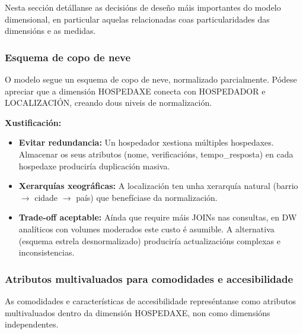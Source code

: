 \documentclass[12pt,a4paper]{article}
\begin{document}
Nesta sección detállanse as decisións de deseño máis importantes do modelo dimensional, en particular aquelas relacionadas coas particularidades das dimensións e as medidas.

\subsubsection{Esquema de copo de neve}

O modelo segue un esquema de copo de neve, normalizado parcialmente. Pódese apreciar que a dimensión HOSPEDAXE conecta con HOSPEDADOR e LOCALIZACIÓN, creando dous niveis de normalización.

\textbf{Xustificación:}
\begin{itemize}
    \item \textbf{Evitar redundancia:} Un hospedador xestiona múltiples hospedaxes. Almacenar os seus atributos (nome, verificacións, tempo\_resposta) en cada hospedaxe produciría duplicación masiva.
    \item \textbf{Xerarquías xeográficas:} A localización ten unha xerarquía natural (barrio $\rightarrow$ cidade $\rightarrow$ país) que benefíciase da normalización.
    \item \textbf{Trade-off aceptable:} Aínda que require máis JOINs nas consultas, en DW analíticos con volumes moderados este custo é asumible. A alternativa (esquema estrela desnormalizado) produciría actualizacións complexas e inconsistencias.
\end{itemize}

\subsubsection{Atributos multivaluados para comodidades e accesibilidade}

As comodidades e características de accesibilidade represéntanse como atributos multivaluados dentro da dimensión HOSPEDAXE, non como dimensións independentes.
\end{document}
